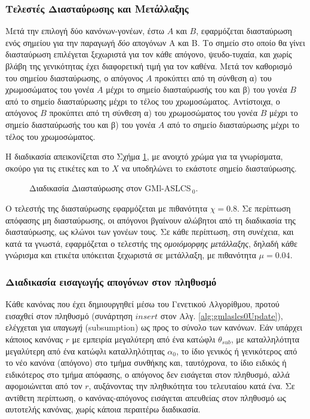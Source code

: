 \subsubsection{Τελεστές Διασταύρωσης και Μετάλλαξης}
Μετά την επιλογή δύο κανόνων-γονέων, έστω $A$ και $B$, εφαρμόζεται διασταύρωση ενός σημείου για την παραγωγή \emph{δύο} απογόνων Α και Β. Το σημείο στο οποίο θα γίνει διασταύρωση επιλέγεται ξεχωριστά για τον κάθε απόγονο, ψευδο-τυχαία, και χωρίς βλάβη της γενικότητας έχει διαφορετική τιμή για τον καθένα. Μετά τον καθορισμό του σημείου διασταύρωσης, ο απόγονος $A$ προκύπτει από τη σύνθεση α) του χρωμοσώματος του γονέα $A$ μέχρι το σημείο διασταύρωσής του και β) του γονέα $B$ από το σημείο διασταύρωσης μέχρι το τέλος του χρωμοσώματος. Αντίστοιχα, ο απόγονος $B$ προκύπτει από τη σύνθεση α) του χρωμοσώματος του γονέα $B$ μέχρι το σημείο διασταύρωσής του και β) του γονέα $A$ από το σημείο διασταύρωσης μέχρι το τέλος του χρωμοσώματος.

Η διαδικασία απεικονίζεται στο Σχήμα \ref{fig:singlePointCrossoverOffsprings}, με ανοιχτό χρώμα για τα γνωρίσματα, σκούρο για τις ετικέτες και το $X$ να υποδηλώνει το εκάστοτε σημείο διασταύρωσης.


\begin{figure}[h!]
\centering
  
  \caption{Διαδικασία Διασταύρωσης στον GMl-ASLCS$_{\:0}$.}
  \label{fig:singlePointCrossoverOffsprings}
\end{figure}

Ο τελεστής της διασταύρωσης εφαρμόζεται με πιθανότητα $\chi = 0.8$. Σε περίπτωση απόφασης μη διασταύρωσης, οι απόγονοι βγαίνουν αλώβητοι από τη διαδικασία της διασταύρωσης, ως κλώνοι των γονέων τους. Σε κάθε περίπτωση, στη συνέχεια, και κατά τα γνωστά, εφαρμόζεται ο τελεστής της \emph{ομοιόμορφης μετάλλαξης}, δηλαδή κάθε γνώρισμα και ετικέτα υπόκειται ξεχωριστά σε μετάλλαξη, με πιθανότητα $\mu = 0.04$. 


\subsubsection{Διαδικασία εισαγωγής απογόνων στον πληθυσμό}
Κάθε κανόνας που έχει δημιουργηθεί μέσω του Γενετικού Αλγορίθμου, προτού εισαχθεί στον πληθυσμό (συνάρτηση $insert$ στον Αλγ. \ref{alg:gmlaslcs0Update}), ελέγχεται για \emph{υπαγωγή} (subsumption) ως προς το σύνολο των κανόνων. Εάν υπάρχει κάποιος κανόνας $r$ με εμπειρία μεγαλύτερη από ένα κατώφλι $\theta_{sub}$, με καταλληλότητα μεγαλύτερη από ένα κατώφλι καταλληλότητας $\alpha_{0}$, το ίδιο γενικός ή γενικότερος από το νέο κανόνα (απόγονο) στο τμήμα συνθήκης και, ταυτόχρονα, το ίδιο ειδικός ή ειδικότερος στο τμήμα απόφασης, ο απόγονος δεν εισάγεται στον πληθυσμό, αλλά αφομοιώνεται από τον $r$, αυξάνοντας την πληθικότητα του τελευταίου κατά ένα. Σε αντίθετη περίπτωση, ο κανόνας-απόγονος εισάγεται απευθείας στον πληθυσμό ως αυτοτελής κανόνας, χωρίς κάποια περαιτέρω διαδικασία.

